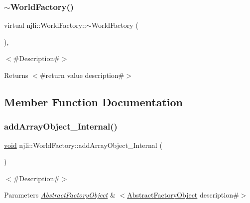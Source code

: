 \subsubsection{\texorpdfstring{$\sim$\+World\+Factory()}{~WorldFactory()}}
{\footnotesize\ttfamily virtual njli\+::\+World\+Factory\+::$\sim$\+World\+Factory (\begin{DoxyParamCaption}{ }\end{DoxyParamCaption})\hspace{0.3cm}{\ttfamily [protected]}, {\ttfamily [virtual]}}

$<$\#\+Description\#$>$

\begin{DoxyReturn}{Returns}
$<$\#return value description\#$>$ 
\end{DoxyReturn}


\subsection{Member Function Documentation}
\mbox{\label{classnjli_1_1_world_factory_ab9fb791c31f5fda79de73949e32fd65a}} 
\subsubsection{\texorpdfstring{add\+Array\+Object\+\_\+\+Internal()}{addArrayObject\_Internal()}}
{\footnotesize\ttfamily \mbox{\hyperlink{_thread_8h_af1e856da2e658414cb2456cb6f7ebc66}{void}} njli\+::\+World\+Factory\+::add\+Array\+Object\+\_\+\+Internal (\begin{DoxyParamCaption}\item[{\mbox{\hyperlink{classnjli_1_1_abstract_factory_object}{Abstract\+Factory\+Object}} $\ast$$\ast$}]{ }\end{DoxyParamCaption})\hspace{0.3cm}{\ttfamily [protected]}}

$<$\#\+Description\#$>$


\begin{DoxyParams}{Parameters}
{\em \mbox{\hyperlink{classnjli_1_1_abstract_factory_object}{Abstract\+Factory\+Object}}} & $<$\mbox{\hyperlink{classnjli_1_1_world_factory_a59f5fcb165066624f68fb5417aa3586e}{Abstract\+Factory\+Object}} description\#$>$ \\
\hline
\end{DoxyParams}
\mbox{\label{classnjli_1_1_world_factory_adda8260e8e970db55234fd12f13ce093}} 
